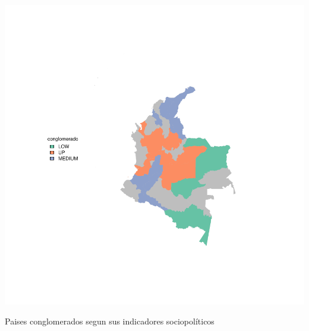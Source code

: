\documentclass{article}
\begin{document}
\centering

\includegraphics{ProyectoFNatiM-getMapconglomerado}

\caption{Paises conglomerados segun sus indicadores sociopolíticos}\label{clustmap}



\renewcommand{\refname}{Bibliografia}

\end{document}
